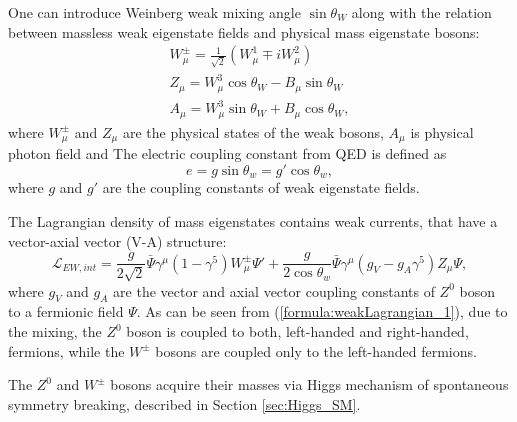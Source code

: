 One can introduce Weinberg weak mixing angle $\sin\theta_W$ along with the relation between massless weak eigenstate fields and physical mass eigenstate bosons:
\begin{equation}
\begin{array}{l}
W^\pm_\mu = \frac{1}{\sqrt{2}}(W^1_\mu \mp iW^2_\mu )\\
Z_\mu = W^3_\mu \cos\theta_W - B_\mu \sin\theta_W\\
A_\mu = W^3_\mu \sin\theta_W + B_\mu \cos\theta_W,
\end{array}
\label{formula:ZWafterSB_1}
\end{equation}
where $W^\pm_\mu$ and $Z_\mu$ are the physical states of the weak bosons, $A_\mu$ is physical photon field and 
The electric coupling constant from QED is defined as 
\begin{equation}
e = g\sin\theta_w = g'\cos\theta_w,
\end{equation}
where $g$ and $g'$ are the coupling constants of weak eigenstate fields.

The Lagrangian density of mass eigenstates contains weak currents, that have a vector-axial vector (V-A) structure:
\begin{equation}
\mathcal{L}_{EW,int} = \frac{g}{2\sqrt{2}}\bar{\Psi}\gamma^\mu(1-\gamma^5)W^\pm_\mu\Psi' +\frac{g}{2\cos\theta_w} \bar{\Psi}\gamma^\mu(g_V-g_A\gamma^5)Z_\mu\Psi,
    \label{formula:weakLagrangian_1}
\end{equation}
where $g_V$ and $g_A$ are the vector and axial vector coupling constants of $Z^0$ boson to a fermionic field $\Psi$. 
As can be seen from (\ref{formula:weakLagrangian_1}), due to the mixing, the $Z^0$ boson is coupled to both, left-handed and right-handed, fermions, while the $W^\pm$ bosons are coupled only to the left-handed fermions.

The $Z^0$ and $W^\pm$ bosons acquire their masses via Higgs mechanism of spontaneous symmetry breaking, described in Section \ref{sec:Higgs_SM}.


